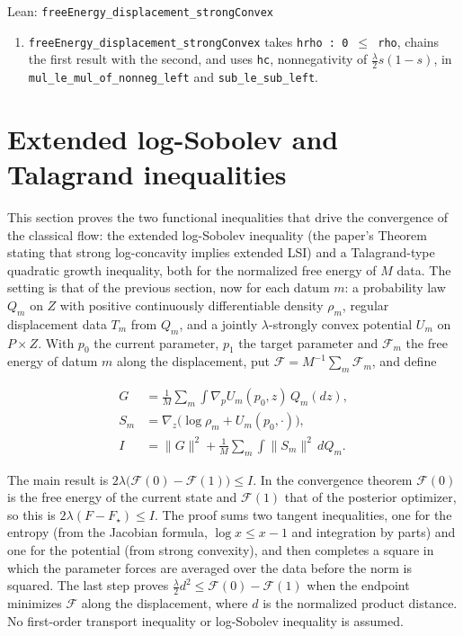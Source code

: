 \documentclass[11pt,a4paper]{report}
\begin{document}
\begin{leanbox}{Lean: \texttt{freeEnergy\_\allowbreak{}displacement\_\allowbreak{}strongConvex}}
\begin{enumerate}
\item \texttt{free\allowbreak{}Energy\_\allowbreak{}displacement\_\allowbreak{}strong\allowbreak{}Convex} takes \texttt{hrho : 0 \ensuremath{\le} rho}, chains the first result with the second, and uses \texttt{hc}, nonnegativity of \(\frac\lambda2s(1-s)\), in \texttt{mul\_\allowbreak{}le\_\allowbreak{}mul\_\allowbreak{}of\_\allowbreak{}nonneg\_\allowbreak{}left} and \texttt{sub\_\allowbreak{}le\_\allowbreak{}sub\_\allowbreak{}left}.

\end{enumerate}
\end{leanbox}
\section{\texorpdfstring{Extended log-Sobolev and Talagrand inequalities}{Extended log-Sobolev and Talagrand inequalities}}


This section proves the two functional inequalities that drive the convergence of the classical flow: the extended log-Sobolev inequality (the paper's Theorem stating that strong log-concavity implies extended LSI) and a Talagrand-type quadratic growth inequality, both for the normalized free energy of \(M\) data. The setting is that of the previous section, now for each datum \(m\): a probability law \(Q_m\) on \(Z\) with positive continuously differentiable density \(\rho_{m}\), regular displacement data \(T_m\) from \(Q_m\), and a jointly \(\lambda\)-strongly convex potential \(U_m\) on \(P\times Z\). With \(p_0\) the current parameter, \(p_1\) the target parameter and \(\mathcal F_m\) the free energy of datum \(m\) along the displacement, put \(\mathcal F=M^{-1}\sum_m\mathcal F_m\), and define


\[\begin{aligned}G&=\frac1M\sum_m\int\nabla_pU_m(p_0,z)\,Q_m(dz),\\ S_m&=\nabla_z\bigl(\log\rho_m+U_m(p_0,\cdot)\bigr),\\I&=\|G\|^2+\frac1M\sum_m\int\|S_m\|^2\,dQ_m.\end{aligned}\]


The main result is \(2\lambda\bigl(\mathcal F(0)-\mathcal F(1)\bigr)\le I\). In the convergence theorem \(\mathcal F(0)\) is the free energy of the current state and \(\mathcal F(1)\) that of the posterior optimizer, so this is \(2\lambda(F-F_\star)\le I\). The proof sums two tangent inequalities, one for the entropy (from the Jacobian formula, \(\log x\le x-1\) and integration by parts) and one for the potential (from strong convexity), and then completes a square in which the parameter forces are averaged over the data before the norm is squared. The last step proves \(\frac\lambda2d^2\le\mathcal F(0)-\mathcal F(1)\) when the endpoint minimizes \(\mathcal F\) along the displacement, where \(d\) is the normalized product distance. No first-order transport inequality or log-Sobolev inequality is assumed.
\end{document}
